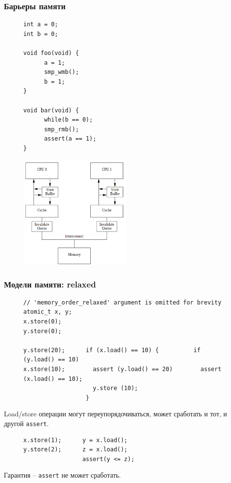 \documentclass[aspectratio=169, pdf, 8pt, unicode]{beamer}
\begin{document}
\begin{frame}[fragile]
\frametitle{Барьеры памяти}
\hspace{0.05\textwidth}
\begin{minipage}{0.2\textwidth}
\begin{figure}[H]
\centering
\begin{BVerbatim}
int a = 0;
int b = 0;

void foo(void) {
      a = 1;
      smp_wmb();
      b = 1;
}

void bar(void) {
      while(b == 0);
      smp_rmb();
      assert(a == 1);
}
\end{BVerbatim}
\end{figure}
\end{minipage}
\begin{minipage}{0.7\textwidth}
\begin{figure}[H]
      \includegraphics[width=0.5\textwidth]{fig/store_buffers.png}
\end{figure}
\end{minipage}
\end{frame}

\begin{frame}[fragile]
\frametitle{Модели памяти: relaxed}
\begin{figure}[H]
\begin{BVerbatim}
// 'memory_order_relaxed' argument is omitted for brevity
atomic_t x, y;
x.store(0);
y.store(0);

y.store(20);      if (x.load() == 10) {          if (y.load() == 10)
x.store(10);        assert (y.load() == 20)        assert (x.load() == 10);
                    y.store (10);
                  }
\end{BVerbatim}
\end{figure}
Load/store операции могут переупорядочиваться, может сработать и тот, и другой \texttt{assert}.
\begin{figure}[H]
\begin{BVerbatim}
x.store(1);      y = x.load();
y.store(2);      z = x.load();
                 assert(y <= z);
\end{BVerbatim}
\end{figure}
Гарантия -- \texttt{assert} не может сработать.
\end{frame}
\end{document}
